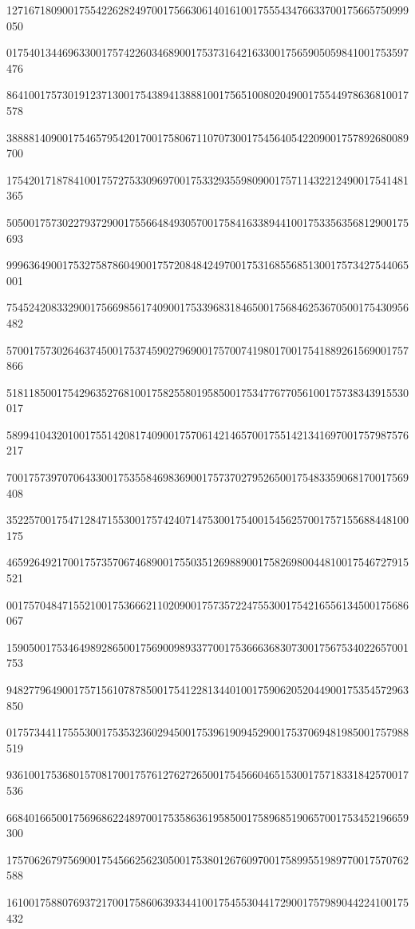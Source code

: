 \documentclass[10pt]{article}
\begin{document}
127167180900175542262824970017566306140161001755543476633700175665750999050\par
017540134469633001757422603468900175373164216330017565905059841001753597476\par
864100175730191237130017543894138881001756510080204900175544978636810017578\par
388881409001754657954201700175806711070730017545640542209001757892680089700\par
175420171878410017572753309697001753329355980900175711432212490017541481365\par
505001757302279372900175566484930570017584163389441001753356356812900175693\par
999636490017532758786049001757208484249700175316855685130017573427544065001\par
754524208332900175669856174090017533968318465001756846253670500175430956482\par
570017573026463745001753745902796900175700741980170017541889261569001757866\par
518118500175429635276810017582558019585001753477677056100175738343915530017\par
589941043201001755142081740900175706142146570017551421341697001757987576217\par
700175739707064330017535584698369001757370279526500175483359068170017569408\par
352257001754712847155300175742407147530017540015456257001757155688448100175\par
465926492170017573570674689001755035126988900175826980044810017546727915521\par
001757048471552100175366621102090017573572247553001754216556134500175686067\par
159050017534649892865001756900989337700175366636830730017567534022657001753\par
948277964900175715610787850017541228134401001759062052044900175354572963850\par
017573441175553001753532360294500175396190945290017537069481985001757988519\par
936100175368015708170017576127627265001754566046515300175718331842570017536\par
668401665001756968622489700175358636195850017589685190657001753452196659300\par
175706267975690017545662562305001753801267609700175899551989770017570762588\par
161001758807693721700175860639334410017545530441729001757989044224100175432\par
\end{document}
